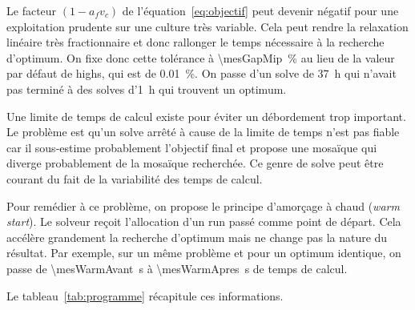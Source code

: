Le facteur $(1 - a_{f} v_{c})$ de l'équation~\eqref{eq:objectif} peut devenir négatif pour une
exploitation prudente sur une culture très variable. Cela peut rendre la relaxation linéaire
très fractionnaire et donc rallonger le temps nécessaire à la recherche d'optimum. On fixe donc
cette tolérance à \SI{\mesGapMip}{\percent} au lieu de la valeur par défaut de \gls{highs}, qui
est de \SI{0.01}{\percent}. On passe d'un solve de \SI{37}{\hour} qui n'avait pas terminé à des
solves d'\SI{1}{\hour} qui trouvent un optimum.

Une limite de temps de calcul existe pour éviter un débordement trop important. Le problème est
qu'un solve arrêté à cause de la limite de temps n'est pas fiable car il sous-estime probablement
l'objectif final et propose une mosaïque qui diverge probablement de la mosaïque recherchée. Ce
genre de solve peut être courant du fait de la variabilité des temps de calcul.

Pour remédier à ce problème, on propose le principe d'amorçage à chaud (\emph{warm start}). Le
solveur reçoit l'allocation d'un run passé comme point de départ. Cela accélère grandement la
recherche d'optimum mais ne change pas la nature du résultat. Par exemple, sur un même problème
et pour un optimum identique, on passe de \SI{\mesWarmAvant}{\second} à
\SI{\mesWarmApres}{\second} de temps de calcul.

Le tableau~\ref{tab:programme} récapitule ces informations.

